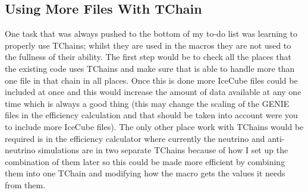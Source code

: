 \documentclass[12pt]{article}
\numberwithin{equation}{section}
\numberwithin{figure}{section}
\begin{document}
\subsection{Using More Files With TChain} %
\label{sub:using_more_files_with_tchain}
One task that was always pushed to the bottom of my to-do list was learning to properly use TChains; whilst they are used in the macros they are not used to the fullness of their ability. The first step would be to check all the places that the existing code uses TChains and make sure that is able to handle more than one file in that chain in all places. Once this is done more IceCube files could be included at once and this would increase the amount of data available at any one time which is always a good thing (this may change the scaling of the GENIE files in the efficiency calculation and that should be taken into account were you to include more IceCube files). The only other place work with TChains would be required is in the efficiency calculator where currently the neutrino and anti-neutrino simulations are in two separate TChains because of how I set up the combination of them later so this could be made more efficient by combining them into one TChain and modifying how the macro gets the values it needs from them.
%
\end{document}
